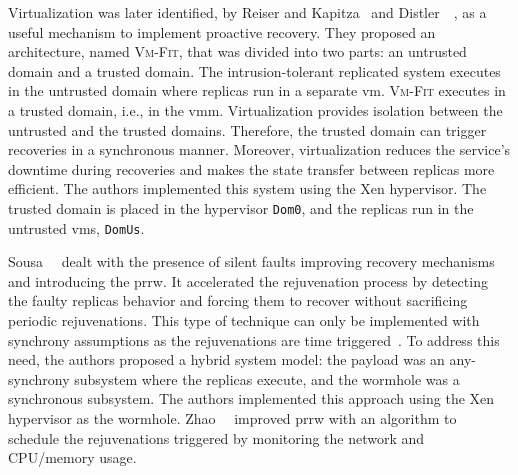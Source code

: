 Virtualization was later identified, by Reiser and Kapitza~\cite{Reiser:2007} and Distler~\etal{}~\cite{Distler:2008}, as a useful mechanism to implement proactive recovery.
They proposed an architecture, named \textsc{Vm-Fit}, that was divided into two parts: an untrusted domain and a trusted domain.
The intrusion-tolerant replicated system executes in the untrusted domain where replicas run in a separate \gls{vm}. 
\textsc{Vm-Fit} executes in a trusted domain, i.e., in the \gls{vmm}. 
Virtualization provides isolation between the untrusted and the trusted domains. 
Therefore, the trusted domain can trigger recoveries in a synchronous manner. 
Moreover, virtualization reduces the service's downtime during recoveries and makes the state transfer between replicas more efficient. 
The authors implemented this system using the Xen hypervisor.
The trusted domain is placed in the hypervisor \texttt{Dom0}, and the replicas run in the untrusted \glspl{vm}, \texttt{DomUs}.

Sousa~\etal{}~\cite{Sousa:2010} dealt with the presence of silent faults improving recovery mechanisms and introducing the \gls{prrw}. 
It accelerated the rejuvenation process by detecting the faulty replicas behavior and forcing them to recover without sacrificing periodic rejuvenations. 
This type of technique can only be implemented with synchrony assumptions as the rejuvenations are time triggered~\cite{Sousa:2005}. 
To address this need, the authors proposed a hybrid system model: the payload was an any-synchrony subsystem where the replicas execute, and the wormhole was a synchronous subsystem. 
The authors implemented this approach using the Xen hypervisor as the wormhole. 
Zhao~\etal{}~\cite{Zhao:2012} improved \gls{prrw} with an algorithm to schedule the rejuvenations triggered by monitoring the network and CPU/memory usage.


